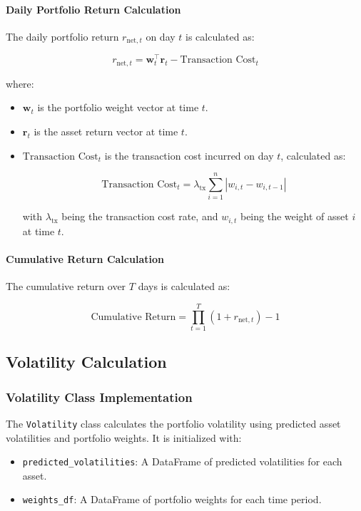 \paragraph{Daily Portfolio Return Calculation}

The daily portfolio return \( r_{\text{net}, t} \) on day \( t \) is calculated as:

\[
r_{\text{net}, t} = \mathbf{w}_t^\top \mathbf{r}_t - \text{Transaction Cost}_t
\]

where:

\begin{itemize}
    \item \( \mathbf{w}_t \) is the portfolio weight vector at time \( t \).
    \item \( \mathbf{r}_t \) is the asset return vector at time \( t \).
    \item \( \text{Transaction Cost}_t \) is the transaction cost incurred on day \( t \), calculated as:

    \[
    \text{Transaction Cost}_t = \lambda_{\text{tx}} \sum_{i=1}^n |w_{i, t} - w_{i, t-1}|
    \]

    with \( \lambda_{\text{tx}} \) being the transaction cost rate, and \( w_{i, t} \) being the weight of asset \( i \) at time \( t \).
\end{itemize}

\paragraph{Cumulative Return Calculation}

The cumulative return over \( T \) days is calculated as:

\[
\text{Cumulative Return} = \prod_{t=1}^T (1 + r_{\text{net}, t}) - 1
\]

\subsection{Volatility Calculation}

\subsubsection{Volatility Class Implementation}

The \texttt{Volatility} class calculates the portfolio volatility using predicted asset volatilities and portfolio weights. It is initialized with:

\begin{itemize}
    \item \texttt{predicted\_volatilities}: A DataFrame of predicted volatilities for each asset.
    \item \texttt{weights\_df}: A DataFrame of portfolio weights for each time period.
\end{itemize}

